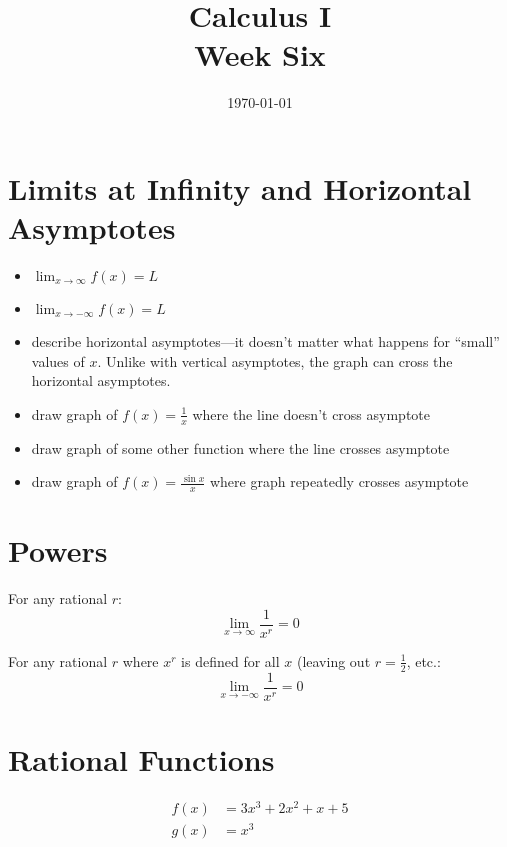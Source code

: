 \documentclass[letterpaper]{exam}
\author{}
\date{\today}
\title{Calculus I \\ Week Six}
\begin{document}
  \maketitle
  \tableofcontents

  \section{Limits at Infinity and Horizontal Asymptotes} 

  \begin{itemize}
    \item $\lim_{x \to \infty} f(x) = L$ 
    \item $\lim_{x \to -\infty} f(x) = L$ 
    \item describe horizontal asymptotes---it doesn't matter what happens for ``small''
      values of $x$. Unlike with vertical asymptotes, the graph can cross the horizontal
      asymptotes.

    \item draw graph of $f(x) = \frac{1}{x}$ where the line doesn't cross asymptote

    \item draw graph of some other function where the line crosses asymptote

    \item draw graph of $f(x) = \frac{\sin x}{x}$ where graph repeatedly crosses asymptote

  \end{itemize}

  \section{Powers}

  For any rational $r$:
  \[
    \lim_{x \to \infty} \frac{1}{x^r} = 0
  \]

  For any rational $r$ where $x^r$ is defined for all $x$ (leaving out $r =
  \frac{1}2$, etc.:
  \[
    \lim_{x \to -\infty} \frac{1}{x^r} = 0
  \]

  \section{Rational Functions}

  \begin{align*}
    f(x) &= 3x^3 + 2x^2 + x + 5 \\
    g(x) &= x^3 \\
  \end{align*}
\end{document}

